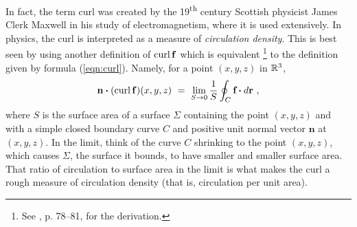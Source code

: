 In fact, the term curl was created by the 19\textsuperscript{th} century Scottish physicist James Clerk Maxwell in his study of electromagnetism, where it is used extensively. 
In physics, the curl is interpreted as a measure of
\emph{circulation density}. 
This is best seen by using another definition of $\mathop{\mathrm{curl}}\nolimits\mathbf{f}$ which is
equivalent%
\footnote{See \cite{sch}, p. 78--81, for the derivation.}  to the definition given by
formula (\ref{eqn:curl}). 
Namely, for a point $(x,y,z)$ in $\mathbb{R}^{3}$,
\begin{equation}\label{eqn:curlalt}
 \mathbf{n} \bm{\cdot} (\mathop{\mathrm{curl}}\nolimits\mathbf{f})(x,y,z) ~=~ \lim_{S \to 0} \frac{1}{S} \oint_{C} \textbf{f} \bm{\cdot} d\textbf{r} ~,
\end{equation}
where $S$ is the surface area of a surface $\Sigma$ containing the point $(x,y,z)$ and with a simple closed boundary
curve $C$ and positive unit normal vector $\mathbf{n}$ at $(x,y,z)$. In the limit, think of the curve $C$ shrinking to
the point $(x,y,z)$, which causes $\Sigma$, the surface it bounds, to have smaller and smaller surface area. That ratio
of circulation to surface area in the limit is what makes the curl a rough measure of circulation density 
(that is, circulation per unit area).

